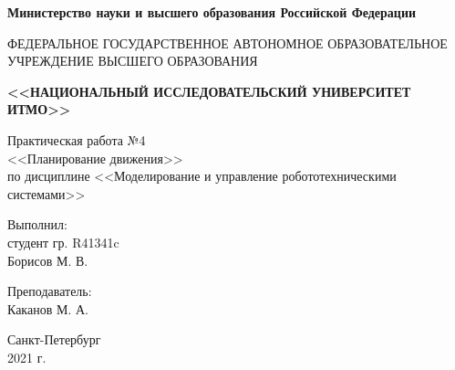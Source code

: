 \begin{titlepage}
    \begin{center}
        \begin{small}
            \textbf{Министерство науки и высшего образования Российской Федерации}

            \vspace{1em}

            ФЕДЕРАЛЬНОЕ ГОСУДАРСТВЕННОЕ АВТОНОМНОЕ ОБРАЗОВАТЕЛЬНОЕ\\
            УЧРЕЖДЕНИЕ ВЫСШЕГО ОБРАЗОВАНИЯ

            \vspace{1em}

            \textbf{<<НАЦИОНАЛЬНЫЙ ИССЛЕДОВАТЕЛЬСКИЙ УНИВЕРСИТЕТ ИТМО>>}
        \end{small}

        \vspace{13ex}

        Практическая работа №4\\
        <<Планирование движения>>\\
        по дисциплине <<Моделирование и управление робототехническими системами>>
    \end{center}

    \vspace{14em}

    \begin{flushright}
        \noindent
        Выполнил:\\
        студент гр. R41341c\\
        Борисов М. В.

        \vspace{1em}
        Преподаватель:\\
        Каканов М. А.
    \end{flushright}

    \vfill

    \begin{center}
        \large{Санкт-Петербург}\\
        2021 г.\\
    \end{center}
\end{titlepage}
